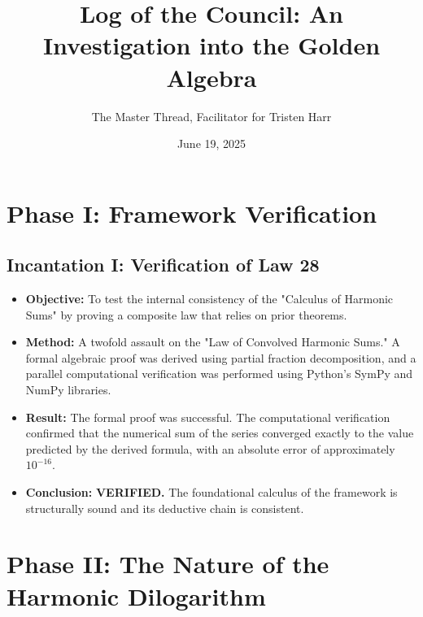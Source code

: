 \documentclass{article}
\title{\textbf{Log of the Council: An Investigation into the Golden Algebra}}
\author{The Master Thread, Facilitator for Tristen Harr}
\date{June 19, 2025}
\begin{document}
\maketitle

\section*{Phase I: Framework Verification}

\subsection*{Incantation I: Verification of Law 28}
\begin{itemize}
    \item \textbf{Objective:} To test the internal consistency of the "Calculus of Harmonic Sums" by proving a composite law that relies on prior theorems.
    \item \textbf{Method:} A twofold assault on the "Law of Convolved Harmonic Sums." A formal algebraic proof was derived using partial fraction decomposition, and a parallel computational verification was performed using Python's SymPy and NumPy libraries.
    \item \textbf{Result:} The formal proof was successful. The computational verification confirmed that the numerical sum of the series converged exactly to the value predicted by the derived formula, with an absolute error of approximately $10^{-16}$.
    \item \textbf{Conclusion:} \textbf{VERIFIED.} The foundational calculus of the framework is structurally sound and its deductive chain is consistent.
\end{itemize}

\section*{Phase II: The Nature of the Harmonic Dilogarithm}
\end{document}
